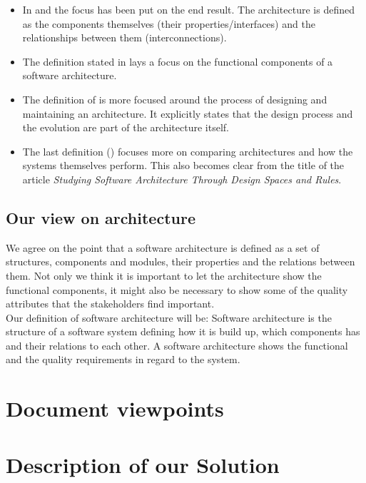 \documentclass{article}
\begin{document}
\begin{itemize}
\item In \cite{clemens} and \cite{hayesroth} the focus has been put on the end result. The architecture is defined as the components themselves (their properties/interfaces) and the relationships between them (interconnections).
\item The definition stated in \cite{hayesroth} lays a focus on the functional components of a software architecture.
\item The definition of \cite{IEEE1471} is more focused around the process of
designing and maintaining an architecture. It explicitly states that the design
process and the evolution are part of the architecture itself.
\item The last definition (\cite{lane90}) focuses more on comparing
architectures and how the systems themselves perform. This also becomes clear
from the title of the article \emph{Studying Software Architecture Through
Design Spaces and Rules}.

\end{itemize}

\subsection{Our view on architecture}

We agree on the point that a software architecture is defined as a set of
structures, components and modules, their properties and the relations
between them. 
Not only we think it is important to let the architecture show the functional components, it might also be necessary to show some of the quality attributes that the stakeholders find important. \\ 

Our definition of software architecture will be:
Software architecture is the structure of a software system defining how it is
build up, which components has and their relations to each other. 
A software architecture shows the functional and the quality requirements in
regard to the system.

\section{Document viewpoints}


\section{Description of our Solution}
\end{document}
